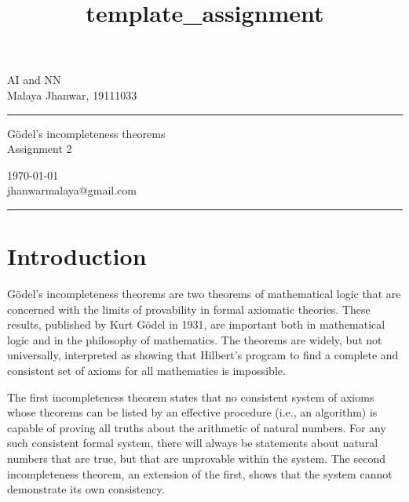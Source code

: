 \documentclass[a4paper,10pt]{article} %
\begin{document}

\title{template_assignment} %
\fancyhead[C]{}
\begin{minipage}{0.295\textwidth} %
\raggedright
AI and NN\\ %
\footnotesize %
Malaya Jhanwar, 19111033 %
\medskip\hrule
\end{minipage}
\begin{minipage}{0.4\textwidth} %
\centering 
\large %
Gödel's incompleteness theorems\\ %
\normalsize %
Assignment 2\\ %
\end{minipage}
\begin{minipage}{0.295\textwidth} %
\raggedleft
\today\\ %
\footnotesize %
jhanwarmalaya@gmail.com%
\medskip\hrule
\end{minipage}

\section{Introduction}
Gödel's incompleteness theorems are two theorems of mathematical logic that are concerned with the limits of provability in formal axiomatic theories. These results, published by Kurt Gödel in 1931, are important both in mathematical logic and in the philosophy of mathematics. The theorems are widely, but not universally, interpreted as showing that Hilbert's program to find a complete and consistent set of axioms for all mathematics is impossible.

The first incompleteness theorem states that no consistent system of axioms whose theorems can be listed by an effective procedure (i.e., an algorithm) is capable of proving all truths about the arithmetic of natural numbers. For any such consistent formal system, there will always be statements about natural numbers that are true, but that are unprovable within the system. The second incompleteness theorem, an extension of the first, shows that the system cannot demonstrate its own consistency.
\end{document}

